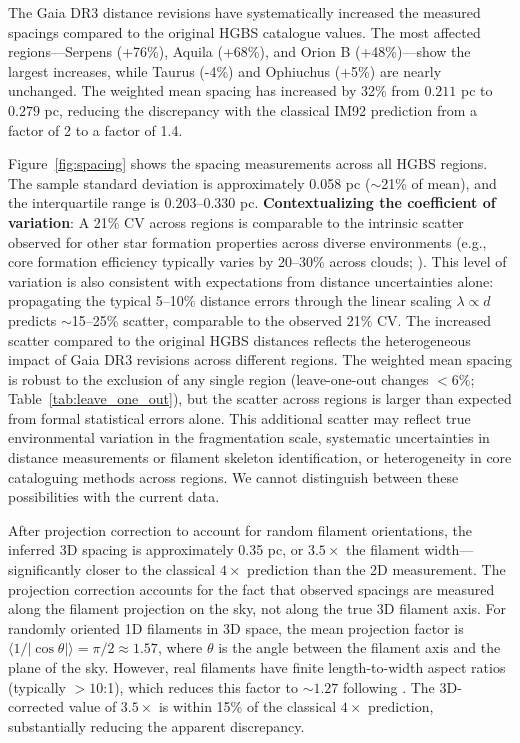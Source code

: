 \documentclass[twoside,twocolumn]{mnras}
\begin{document}
The Gaia DR3 distance revisions have systematically increased the measured spacings compared to the original HGBS catalogue values. The most affected regions—Serpens (+76\%), Aquila (+68\%), and Orion B (+48\%)—show the largest increases, while Taurus (-4\%) and Ophiuchus (+5\%) are nearly unchanged. The weighted mean spacing has increased by 32\% from $0.211$ pc to $0.279$ pc, reducing the discrepancy with the classical IM92 prediction from a factor of 2 to a factor of 1.4.

Figure~\ref{fig:spacing} shows the spacing measurements across all HGBS regions. The sample standard deviation is approximately 0.058 pc ($\sim$21\% of mean), and the interquartile range is $0.203$--$0.330$ pc. \textbf{Contextualizing the coefficient of variation}: A 21\% CV across regions is comparable to the intrinsic scatter observed for other star formation properties across diverse environments (e.g., core formation efficiency typically varies by 20--30\% across clouds; \citet{Molinari2022}). This level of variation is also consistent with expectations from distance uncertainties alone: propagating the typical 5--10\% distance errors through the linear scaling $\lambda \propto d$ predicts $\sim$15--25\% scatter, comparable to the observed 21\% CV. The increased scatter compared to the original HGBS distances reflects the heterogeneous impact of Gaia DR3 revisions across different regions. The weighted mean spacing is robust to the exclusion of any single region (leave-one-out changes $<6\%$; Table~\ref{tab:leave_one_out}), but the scatter across regions is larger than expected from formal statistical errors alone. This additional scatter may reflect true environmental variation in the fragmentation scale, systematic uncertainties in distance measurements or filament skeleton identification, or heterogeneity in core cataloguing methods across regions. We cannot distinguish between these possibilities with the current data.

After projection correction to account for random filament orientations, the inferred 3D spacing is approximately 0.35 pc, or $3.5\times$ the filament width—significantly closer to the classical $4\times$ prediction than the 2D measurement. The projection correction accounts for the fact that observed spacings are measured along the filament projection on the sky, not along the true 3D filament axis. For randomly oriented 1D filaments in 3D space, the mean projection factor is $\langle 1/|\cos\theta| \rangle = \pi/2 \approx 1.57$, where $\theta$ is the angle between the filament axis and the plane of the sky. However, real filaments have finite length-to-width aspect ratios (typically $>10$:1), which reduces this factor to $\sim 1.27$ following \citet{Hacar2013}. The 3D-corrected value of $3.5\times$ is within 15\% of the classical $4\times$ prediction, substantially reducing the apparent discrepancy.
\end{document}
